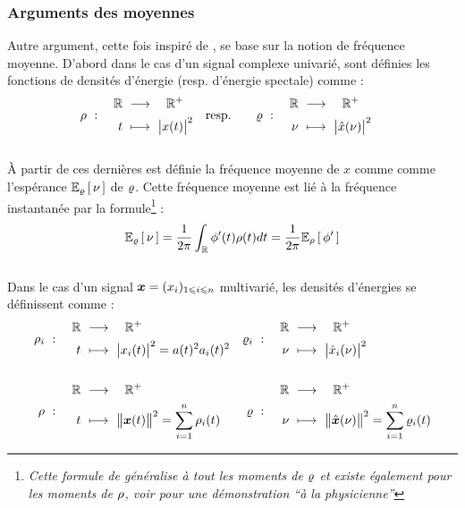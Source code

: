 \subsubsection*{Arguments des moyennes}

Autre argument, cette fois inspiré de \cite{cano_mathematical_2022}, se base sur la notion de fréquence moyenne.
D'abord dans le cas d'un signal complexe univarié, sont définies les fonctions de densités d'énergie (resp. d'énergie spectale) comme :
\begin{align}\label{eq:densi_dE}
	\densit\ &:\quad \begin{aligned}\R\ &\lr\quad \R^+ \\ t\ &\longmapsto\ \big|x(t)\big|^2 \end{aligned}  
	&
	\text{resp.}\qquad \densis\ &:\quad \begin{aligned}\R\ &\lr\quad \R^+ \\ \nu\ &\longmapsto\ \big|\fou{x}(\nu)\big|^2 \end{aligned}
\end{align}
\\
À partir de ces dernières est définie la fréquence moyenne de $x$ comme comme l'espérance $\esp[\densis]{\nu}$ de $\densis$. Cette fréquence moyenne est lié à la fréquence instantanée par la formule\footnote{\itshape
	Cette formule de généralise à tout les moments de $\densis$ et existe également pour les moments de $\densit$, voir \cite[sec. 1.4]{cohen_time_1995} pour une démonstration ``à la physicienne''
} :
\begin{equation}\label{eq:esp_freq}
	\esp[\densis]{\nu} = \frac{1}{2\pi}\int_\R \phi'(t)\densit(t)dt = \frac{1}{2\pi} \esp[\densit]{\phi'}
\end{equation}
\\
Dans le cas d'un signal $\x=(x_i)_{1\leq i\leq n}$ multivarié, les densités d'énergies se définissent comme :
\begin{align*}%
	\densit_i\ &:\quad \begin{aligned}\R\ &\lr\quad \R^+ \\ t\ &\longmapsto\ \big|x_i(t)\big|^2 = a(t)^2 a_i(t)^2 \end{aligned}  
	&
	\densis_i\ &:\quad \begin{aligned}\R\ &\lr\quad \R^+ \\ \nu\ &\longmapsto\ \big|\fou{x}_i(\nu)\big|^2 \end{aligned} \\ \\
	\densit\ &:\quad \begin{aligned}\R\ &\lr\quad \R^+ \\ t\ &\longmapsto\ \big\|\x(t)\big\|^2 = \sum_{i=1}^n \densit_i(t) \end{aligned}  
	&
	\densis\ &:\quad \begin{aligned}\R\ &\lr\quad \R^+ \\ \nu\ &\longmapsto\ \big\|\fou{\x}(\nu)\big\|^2 = \sum_{i=1}^n \densis_i(t) \end{aligned}	
\end{align*}
